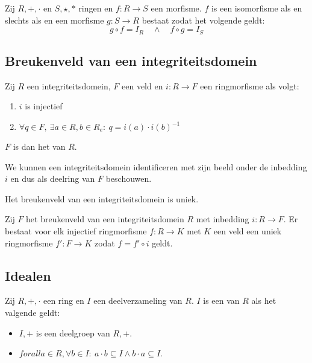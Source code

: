 \documentclass[main.tex]{subfiles}
\begin{document}
\begin{pr}
  Zij $R,+,\cdot$ en $S,\star,*$ ringen en $f: R \rightarrow S$ een morfisme.
  $f$ is een isomorfisme als en slechts als en een morfisme $g: S \rightarrow R$ bestaat zodat het volgende geldt:
  \[ g \circ f = I_{R} \quad\wedge\quad f \circ g = I_{S} \]
\end{pr}

\subsection{Breukenveld van een integriteitsdomein}
\label{sec:breukenveld-van-een-integriteitsdomein}

\begin{de}
  Zij $R$ een integriteitsdomein, $F$ een veld en $i: R \rightarrow F$ een ringmorfisme als volgt:
  \begin{enumerate}
  \item $i$ is injectief
  \item $\forall q \in F,\ \exists a \in R, b\in R_{e}:\ q = i(a)\cdot i(b)^{-1}$
  \end{enumerate}
  $F$ is dan het  van $R$.
\end{de}

\begin{st}
  We kunnen een integriteitsdomein identificeren met zijn beeld onder de inbedding $i$ en dus als deelring van $F$ beschouwen.
\end{st}

\begin{ei}
  Het breukenveld van een integriteitsdomein is uniek.
\end{ei}

\begin{ei}
  Zij $F$ het breukenveld van een integriteitsdomein $R$ met inbedding $i: R \rightarrow F$.
  Er bestaat voor elk injectief ringmorfisme $f: R \rightarrow K$ met $K$ een veld een uniek ringmorfisme $f': F \rightarrow K$ zodat $f = f' \circ i$ geldt.
\end{ei}

\subsection{Idealen}
\label{sec:idealen}


\begin{de}
  Zij $R,+,\cdot$ een ring en $I$ een deelverzameling van $R$.
  $I$ is een  van $R$ als het valgende geldt:
  \begin{itemize}
  \item $I,+$ is een deelgroep van $R,+$.
  \item $forall a \in R, \forall b \in I:\ a\cdot b \subseteq I \wedge b\cdot a \subseteq I$. 
  \end{itemize}
\end{de}
\end{document}
